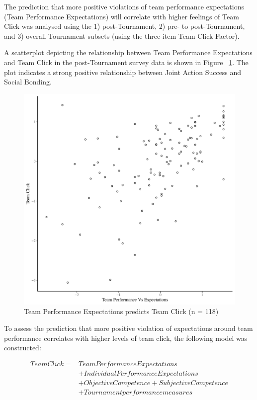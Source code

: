 The prediction that more positive violations of team performance expectations (Team Performance Expectations) will correlate with higher feelings of Team Click was analysed using the 1) post-Tournament, 2) pre- to post-Tournament, and 3) overall Tournament subsets (using the three-item Team Click Factor).

A scatterplot depicting the relationship between Team Performance Expectations and Team Click in the post-Tournament survey data is shown in Figure ~\ref{fig:teamPerfClickBasicXY}. The plot indicates a strong positive relationship between Joint Action Success and Social Bonding.

\begin{figure}[htbp]
  \centering
\includegraphics[scale=.5]{images/teamPerfClickBasicXY.pdf}
  \caption{Team Performance Expectations predicts Team Click (n = 118)}
  \label{fig:teamPerfClickBasicXY}
\end{figure}

To assess the prediction that more positive violation of expectations around team performance correlates with higher levels of team click, the following model was constructed:


    \begin{align*}
      Team Click =  & Team Performance Expectations \\
                &+ Individual Performance Expectations \\
                &+ Objective Competence + Subjective Competence \\
                &+ Tournament performance measures \\
    \end{align*}


